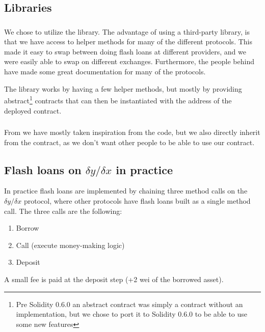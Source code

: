 \subsection{Libraries}
\subsubsection{}
We chose to utilize the  library. The advantage of using a
third-party library, is that we have access to helper methods for many of the
different protocols. This made it easy to swap between doing flash loans at
different providers, and we were easily able to swap on different exchanges.
Furthermore, the people behind  have made some great
documentation for many of the protocols.

The  library works by having a few helper methods, but mostly
by providing abstract\footnote{Pre Solidity 0.6.0 an abstract contract was
simply a contract without an implementation, but we chose to port it to Solidity
0.6.0 to be able to use some new features} contracts that can then be
instantiated with the address of the deployed contract.

\subsubsection{}

From  we have mostly taken inspiration from the code, but we
also directly inherit from the  contract, as we don't want other
people to be able to use our contract.

\subsection{Flash loans on $\delta y/\delta x$ in practice}
In practice flash loans are implemented by chaining three method calls on the
$\delta y/\delta x$ protocol, where other protocols have flash loans built
as a single method call. The three calls are the following:
\begin{enumerate}
    \item Borrow
    \item Call (execute money-making logic)
    \item Deposit
\end{enumerate}
A small fee is paid at the deposit step (+2 wei of the borrowed asset).

